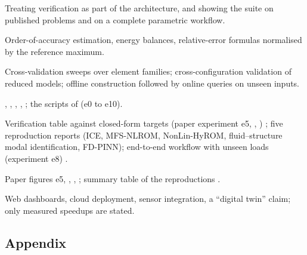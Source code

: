 \begin{description}[style=nextline,leftmargin=1em]
\item[Focus] Treating verification as part of the architecture, and showing the suite on published problems and on a complete parametric workflow.
\item[Mathematics] Order-of-accuracy estimation, energy balances, relative-error formulas normalised by the reference maximum.
\item[Algorithm] Cross-validation sweeps over element families; cross-configuration validation of reduced models; offline construction followed by online queries on unseen inputs.
\item[Implementation] , , , , ; the scripts of  (e0 to e10).
\item[Verification] Verification table against closed-form targets (paper experiment e5, , ) \have{}; five reproduction reports \have{} (ICE, MFS-NLROM, NonLin-HyROM, fluid--structure modal identification, FD-PINN); end-to-end workflow with unseen loads (experiment e8) \have{}.
\item[Figures and tables] Paper figures e5, , ,  \have{}; summary table of the reproductions .
\item[Exclusions] Web dashboards, cloud deployment, sensor integration, a ``digital twin'' claim; only measured speedups are stated.
\end{description}

\subsection*{Appendix}

